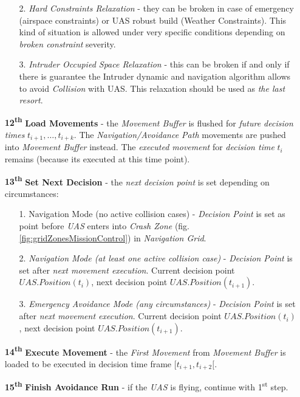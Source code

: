 \begin{itemize}
\begin{note}
\begin{itemize}
            \item[2.] \emph{Hard Constraints Relaxation} - they can be broken in case of emergency (airspace constraints) or UAS robust build (Weather Constraints). This kind of situation is allowed under very specific conditions depending on \emph{broken constraint} severity.
            
            \item[3.] \emph{Intruder Occupied Space Relaxation} - this can be broken if and only if there is guarantee the Intruder dynamic and navigation algorithm allows to avoid \emph{Collision} with UAS. This relaxation should be used as \emph{the last resort}.
        \end{itemize}
    \end{note}
    
    \item[\textbf{12\textsuperscript{th}}] \textbf{Load Movements} - the \emph{Movement Buffer} is flushed for \emph{future decision times} $t_{i+1}, \dots, t_{i+k}$. The \emph{Navigation/Avoidance Path} movements are pushed into \emph{Movement Buffer} instead. The \emph{executed movement} for \emph{decision time} $t_i$ remains (because its executed at this time point).
    
    \item[\textbf{13\textsuperscript{th}}] \textbf{Set Next Decision} - the \emph{next decision point} is set depending on circumstances:
    \begin{itemize}
        \item[1.] Navigation Mode (no active collision cases) - \emph{Decision Point} is set as point before \emph{UAS} enters into \emph{Crash Zone} (fig. \ref{fig:gridZonesMissionControl}) in \emph{Navigation Grid}.
        
        \item[2.] \emph{Navigation Mode (at least one active collision case)} - \emph{Decision Point} is set after \emph{next movement execution}. Current decision point $UAS.Position(t_i)$, next decision point $UAS.Position(t_{i+1})$.
        
        \item[3.] \emph{Emergency Avoidance Mode (any circumstances)} - \emph{Decision Point} is set after \emph{next movement execution}. Current decision point $UAS.Position(t_i)$, next decision point $UAS.Position(t_{i+1})$.
    \end{itemize}
    
    \item[\textbf{14\textsuperscript{th}}] \textbf{Execute Movement} - the \emph{First Movement} from \emph{Movement Buffer} is loaded to be executed in decision time frame $[t_{i+1}, t_{i+2}[$. 
    
    \item[\textbf{15\textsuperscript{th}}] \textbf{Finish Avoidance Run} - if the \emph{UAS} is flying, continue with 1\textsuperscript{st} step. 
\end{itemize}

